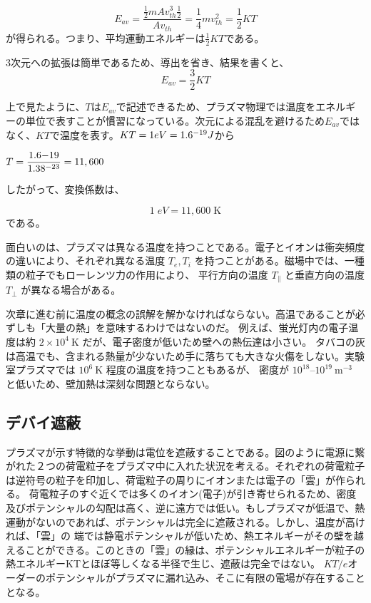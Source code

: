 \documentclass{ltjsarticle}
\numberwithin{equation}{section} %
\begin{document}
\begin{equation}
  E_{av} = \frac{\frac{1}{2}mAv_{th}^3\frac{1}{2}}{Av_{th}} = \frac{1}{4}mv_{th}^2 = \frac{1}{2}KT \label{av.kenetic}
\end{equation}
が得られる。つまり、平均運動エネルギーは$\frac{1}{2}KT$である。

3次元への拡張は簡単であるため、導出を省き、結果を書くと、
\begin{equation}
  E_{av} = \frac{3}{2}KT
\end{equation}

上で見たように、$T$は$E_{av}$で記述できるため、プラズマ物理では温度をエネルギーの単位で表すことが慣習になっている。次元による混乱を避けるため$E_{av}$ではなく、$KT$で温度を表す。$KT = 1\space eV = 1.6 \time 10^{-19}\space J $から

\begin{center}
  $T= \dfrac{1.6\time 10{-19}}{1.38\time 10^{-23}} = {11,600}$
\end{center}
したがって、変換係数は、

\begin{equation}
  1\;\unit{eV}= {11,600}\; \unit{\kelvin}
\end{equation}
である。

面白いのは、プラズマは異なる温度を持つことである。電子とイオンは衝突頻度の違いにより、それぞれ異なる温度
  \( T_e, T_i \) を持つことがある。磁場中では、一種類の粒子でもローレンツ力の作用により、
  平行方向の温度 \( T_{\parallel} \) と垂直方向の温度 \( T_{\perp} \) が異なる場合がある。

次章に進む前に温度の概念の誤解を解かなければならない。高温であることが必ずしも「大量の熱」を意味するわけではないのだ。
例えば、蛍光灯内の電子温度は約 $2\times 10^4 \ \mathrm{K}$ だが、電子密度が低いため壁への熱伝達は小さい。
タバコの灰は高温でも、含まれる熱量が少ないため手に落ちても大きな火傷をしない。実験室プラズマでは $10^6 \ \mathrm{K}$ 程度の温度を持つこともあるが、
密度が $10^{18}$--$10^{19} \ \mathrm{m^{-3}}$ と低いため、壁加熱は深刻な問題とならない。


\subsection{デバイ遮蔽}
プラズマが示す特徴的な挙動は電位を遮蔽することである。図のように電源に繋がれた２つの荷電粒子をプラズマ中に入れた状況を考える。それぞれの荷電粒子は逆符号の粒子を印加し、荷電粒子の周りにイオンまたは電子の「雲」が作られる。
荷電粒子のすぐ近くでは多くのイオン(電子)が引き寄せられるため、密度及びポテンシャルの勾配は高く、逆に遠方では低い。もしプラズマが低温で、熱運動がないのであれば、ポテンシャルは完全に遮蔽される。しかし、温度が高ければ、「雲」の
端では静電ポテンシャルが低いため、熱エネルギーがその壁を越えることができる。このときの「雲」の縁は、ポテンシャルエネルギーが粒子の熱エネルギーKTとほぼ等しくなる半径で生じ、遮蔽は完全ではない。
$KT/e$オーダーのポテンシャルがプラズマに漏れ込み、そこに有限の電場が存在することとなる。
\end{document}
